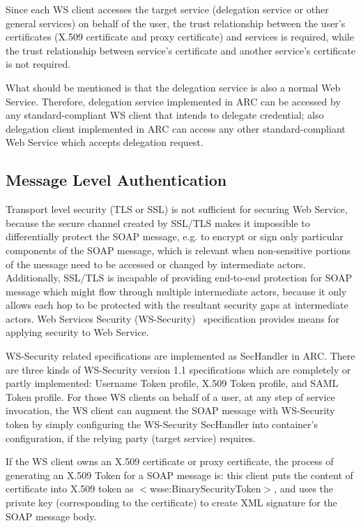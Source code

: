 \documentclass[twocolumn]{svjour3}         %
\begin{document}
Since each WS client accesses the target service (delegation service or other general services) on behalf of the user, the trust relationship between the user's certificates (X.509 certificate and proxy certificate) and services is required, while the trust relationship between service's certificate and another service's certificate is not required.

What should be mentioned is that the delegation service is also a normal Web Service. Therefore, delegation service implemented in ARC can be accessed by any standard-compliant WS client that intends to delegate credential; also delegation client implemented in ARC can access any other standard-compliant Web Service which accepts delegation request.

\subsection{Message Level Authentication}
\label{sec:msgauthn}
Transport level security (TLS or SSL) is not sufficient for securing Web Service, because the secure channel created by SSL/TLS makes it impossible to differentially protect the SOAP message, e.g. to encrypt or sign only particular components of the SOAP message, which is relevant when non-sensitive portions of the message need to be accessed or changed by intermediate actors. Additionally, SSL/TLS is incapable of providing end-to-end protection for SOAP message which might flow through multiple intermediate actors, because it only allows each hop to be protected with the resultant security gaps at intermediate actors. Web Services Security (WS-Security)~\cite{WSSeclink} specification provides means for applying security to Web Service.

WS-Security related specifications are implemented as SecHandler in ARC. There are three kinds of WS-Security version 1.1 specifications which are completely or partly implemented: Username Token profile, X.509 Token profile, and SAML Token profile. For those WS clients on behalf of a user, at any step of service invocation, the WS client can augment the SOAP message with WS-Security token by simply configuring the WS-Security SecHandler into container’s configuration, if the relying party (target service) requires.

If the WS client owns an X.509 certificate or proxy certificate, the process of generating an X.509 Token for a SOAP message is: this client puts the content of certificate into X.509 token as $<$wsse:BinarySecurityToken$>$, and uses the private key (corresponding to the certificate) to create XML signature for the SOAP message body.
\end{document}
